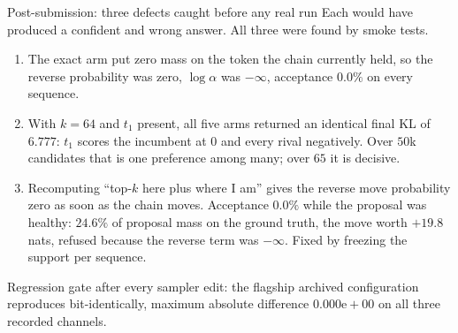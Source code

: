 \documentclass{beamer}
\begin{document}
\begin{frame}[noframenumbering]{Post-submission: three defects caught before any real run}
  \small
  Each would have produced a confident and wrong answer. All three were found by smoke tests.
  \begin{enumerate}\small
    \item {} The exact arm put zero mass on the token
      the chain currently held, so the reverse probability was zero, $\log\alpha$ was $-\infty$,
      acceptance $0.0\%$ on every sequence.
    \item {} With $k=64$ and $t_1$ present,
      all five arms returned an identical final KL of $6.777$: $t_1$ scores the incumbent at $0$
      and every rival negatively. Over $50$k candidates that is one preference among many; over
      $65$ it is decisive.
    \item {} Recomputing ``top-$k$ here
      plus where I am'' gives the reverse move probability zero as soon as the chain moves.
      Acceptance $0.0\%$ while the proposal was healthy: $24.6\%$ of proposal mass on the ground
      truth, the move worth $+19.8$ nats, refused because the reverse term was $-\infty$. Fixed
      by freezing the support per sequence.
  \end{enumerate}
  \vspace{0.2em}
  {\footnotesize Regression gate after every sampler edit: the flagship archived configuration
  reproduces bit-identically, maximum absolute difference $0.000\mathrm{e}{+}00$ on all three
  recorded channels.}
\end{frame}
\end{document}
